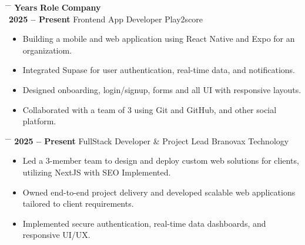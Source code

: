 \documentclass{article}
\newcommand{\sectiondivider}[2][0.4]{%
    \noindent
    \vspace{3pt}
    \textcolor{black}{%
        \noindent
        \makebox[\linewidth]{\rule{#1\linewidth}{0.5pt}%
        \hspace{5pt} \textbf{\uppercase{#2}} \hspace{5pt}%
        \rule{#1\linewidth}{0.5pt}}%
    }
    \vspace{3pt}
}
\begin{document}
\sectiondivider[0.38]{Work Experiences}
\noindent
\begin{tabbing}
    \hspace{5cm} \= \hspace{8cm} \= \kill 
    \textbf{Years} \> \textbf{Role}  \> \textbf{Company} \\[0.3cm]
    \textbf{2025 -- Present} \> Frontend App Developer  \> Play2score \\[0.1cm]
\end{tabbing}
\vspace{-0.3cm}
\begin{itemize}
    \item Building a mobile and web application using React Native and Expo for an organizatiom.
    \item Integrated Supase for user authentication, real-time data, and notifications.
    \item Designed onboarding, login/signup, forms and all UI with responsive layouts.
    \item Collaborated with a team of 3 using Git and GitHub, and other social platform.
\end{itemize}

\vspace{0.2cm}

\noindent
\begin{tabbing}
    \hspace{5cm} \= \hspace{8cm} \= \kill
    \textbf{2025 -- Present} \> FullStack Developer \& Project Lead  \> Branovax Technology \\[0.1cm]
\end{tabbing}
\vspace{-0.3cm}
\begin{itemize}
    \item Led a 3-member team to design and deploy custom web solutions for clients, utilizing NextJS with SEO Implemented.
    \item Owned end-to-end project delivery and developed scalable web applications tailored to client requirements.
    \item Implemented secure authentication, real-time data dashboards, and responsive UI/UX.
\end{itemize}

\vspace{0.2cm}
\end{document}
